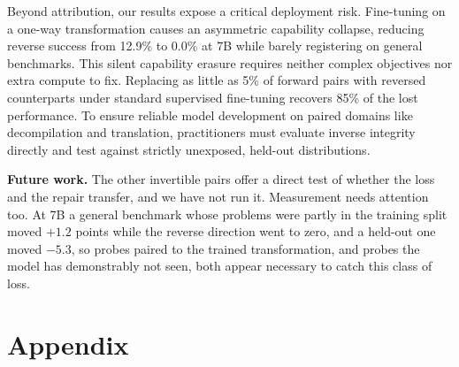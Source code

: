 \documentclass{article}
\begin{document}
Beyond attribution, our results expose a critical deployment risk. Fine-tuning on a one-way transformation causes an asymmetric capability collapse, reducing reverse success from 12.9\% to 0.0\% at 7B while barely registering on general benchmarks. This silent capability erasure requires neither complex objectives nor extra compute to fix. Replacing as little as 5\% of forward pairs with reversed counterparts under standard supervised fine-tuning recovers 85\% of the lost performance. To ensure reliable model development on paired domains like decompilation and translation, practitioners must evaluate inverse integrity directly and test against strictly unexposed, held-out distributions.

\textbf{Future work.} The other invertible pairs offer a direct test of whether the loss and the
repair transfer, and we have not run it. Measurement needs attention too. At 7B a
general benchmark whose problems were partly in the training split moved
$+1.2$ points while the reverse direction went to zero, and a held-out one moved $-5.3$, so
probes paired to the trained transformation, and probes the model has demonstrably not seen,
both appear necessary to catch this class of loss.



\appendix
\section*{Appendix}
\end{document}
